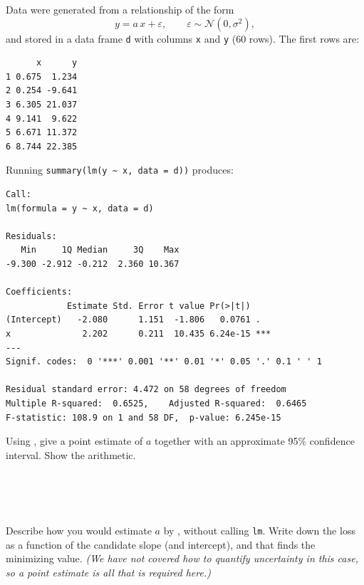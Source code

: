 \question{}

Data were generated from a relationship of the form
\[
  y = a\,x + \varepsilon, \qquad \varepsilon \sim \mathcal{N}(0, \sigma^2),
\]
and stored in a data frame \verb|d| with columns \verb|x| and \verb|y| (60 rows). The first rows are:

\begin{verbatim}
      x      y
1 0.675  1.234
2 0.254 -9.641
3 6.305 21.037
4 9.141  9.622
5 6.671 11.372
6 8.744 22.385
\end{verbatim}

Running \verb|summary(lm(y ~ x, data = d))| produces:

\begin{verbatim}
Call:
lm(formula = y ~ x, data = d)

Residuals:
   Min     1Q Median     3Q    Max
-9.300 -2.912 -0.212  2.360 10.367

Coefficients:
            Estimate Std. Error t value Pr(>|t|)
(Intercept)   -2.080      1.151  -1.806   0.0761 .
x              2.202      0.211  10.435 6.24e-15 ***
---
Signif. codes:  0 '***' 0.001 '**' 0.01 '*' 0.05 '.' 0.1 ' ' 1

Residual standard error: 4.472 on 58 degrees of freedom
Multiple R-squared:  0.6525,    Adjusted R-squared:  0.6465
F-statistic: 108.9 on 1 and 58 DF,  p-value: 6.245e-15
\end{verbatim}

\ifanswerspace\newpage\continuequestion\fi

\subquestion[6]{}
Using , give a point estimate of $a$ together with an approximate 95\% confidence interval. Show the arithmetic.

\ifanswerspace
\begin{verbatim}




\end{verbatim}
\vfillstretch
\newpage
\fi

\subquestion[6]{}
Describe how you would estimate $a$ by , without calling \verb|lm|. Write down the loss as a function of the candidate slope (and intercept), and  that finds the minimizing value. \emph{(We have not covered how to quantify uncertainty in this case, so a point estimate is all that is required here.)}

\ifanswerspace
\begin{verbatim}










\end{verbatim}
\vfillstretch
\newpage
\fi

